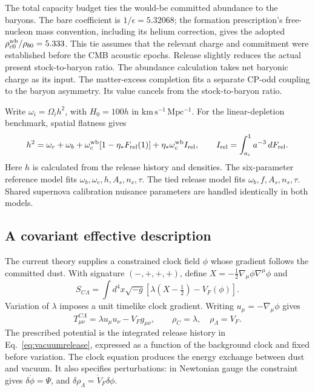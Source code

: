 The total capacity budget ties the would-be committed abundance to the
baryons. The bare coefficient is $1/\epsilon=5.32068$; the formation
prescription's free-nucleon mass convention, including its helium
correction, gives the adopted $\rho_{c0}^{\rm wb}/\rho_{b0}=5.333$.
This tie assumes that the relevant charge and commitment were established
before the CMB acoustic epochs. Release slightly reduces the actual
present stock-to-baryon ratio. The abundance calculation takes net
baryonic charge as its input. The matter-excess completion fits a
separate CP-odd coupling to the baryon asymmetry. Its value cancels from
the stock-to-baryon ratio. 

Write $\omega_i=\Omega_i h^2$, with $H_0=100h$ in
$\mathrm{km\,s^{-1}\,Mpc^{-1}}$. For the linear-depletion benchmark, spatial flatness gives
\begin{equation}
h^2=\omega_r+\omega_b+
\omega_c^{\rm wb}[1-\eta_*F_{\rm rel}(1)]
+\eta_*\omega_c^{\rm wb} I_{\rm rel},\qquad
I_{\rm rel}=\int_{a_i}^{1}a^{-3}\,dF_{\rm rel}.
\label{eq:flatness}
\end{equation}
Here $h$ is calculated from the release history and densities.
The six-parameter reference model fits $\omega_b,\omega_c,h,A_s,n_s,\tau$.
The tied release model fits $\omega_b,f,A_s,n_s,\tau$. Shared supernova
calibration nuisance parameters are handled identically in both models.

\subsection{A covariant effective description}

The current theory supplies a constrained clock field $\phi$ whose
gradient follows the committed dust. With signature $(-,+,+,+)$, define
$X=-\tfrac12\nabla_\mu\phi\nabla^\mu\phi$ and
\begin{equation}
S_{C\Lambda}=\int d^4x\sqrt{-g}
\left[\lambda\left(X-\tfrac12\right)-V_F(\phi)\right].
\end{equation}
Variation of $\lambda$ imposes a unit timelike clock gradient.
Writing $u_\mu=-\nabla_\mu\phi$ gives
\begin{equation}
T_{\mu\nu}^{C\Lambda}=\lambda u_\mu u_\nu-V_Fg_{\mu\nu},
\qquad \rho_C=\lambda,\quad\rho_\Lambda=V_F.
\end{equation}
The prescribed potential is the integrated release history in
Eq.~\eqref{eq:vacuumrelease}, expressed as a function of the background
clock and fixed before variation. The clock equation produces the
energy exchange between dust and vacuum. It also specifies perturbations:
in Newtonian gauge the constraint gives $\delta\dot\phi=\Psi$, and
$\delta\rho_\Lambda=\dot V_F\delta\phi$.

